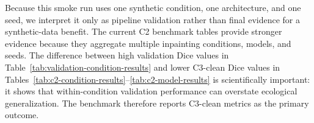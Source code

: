 Because this smoke run uses one synthetic condition, one architecture, and one seed, we interpret it only as pipeline validation rather than final evidence for a synthetic-data benefit. The current C2 benchmark tables provide stronger evidence because they aggregate multiple inpainting conditions, models, and seeds. The difference between high validation Dice values in Table~\ref{tab:validation-condition-results} and lower C3-clean Dice values in Tables~\ref{tab:c2-condition-results}--\ref{tab:c2-model-results} is scientifically important: it shows that within-condition validation performance can overstate ecological generalization. The benchmark therefore reports C3-clean metrics as the primary outcome.
